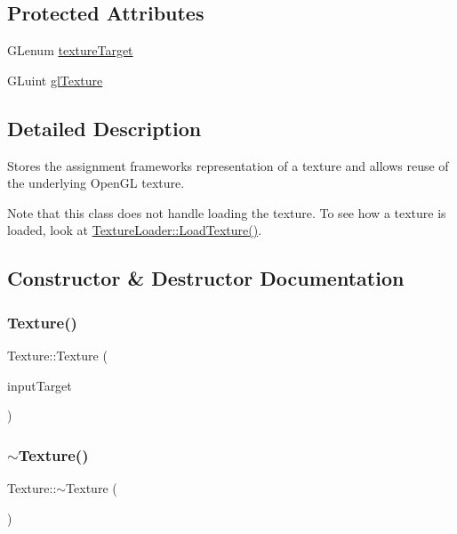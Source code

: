 \subsection*{Protected Attributes}
\begin{DoxyCompactItemize}
\item 
G\+Lenum \hyperlink{class_texture_a743402dc306a143404ee2d246d864fb7}{texture\+Target}
\item 
G\+Luint \hyperlink{class_texture_adbf320788255a426a0a60e35cd969bcd}{gl\+Texture}
\end{DoxyCompactItemize}


\subsection{Detailed Description}
Stores the assignment framework\textquotesingle{}s representation of a texture and allows reuse of the underlying Open\+GL texture. 

Note that this class does not handle loading the texture. To see how a texture is loaded, look at \hyperlink{namespace_texture_loader_aed2af32d44d07368f1f426c4274418c0}{Texture\+Loader\+::\+Load\+Texture()}. 

\subsection{Constructor \& Destructor Documentation}
\hypertarget{class_texture_aa9661e01f3c034c259c15b619e2cea55}{}\label{class_texture_aa9661e01f3c034c259c15b619e2cea55} 
\subsubsection{\texorpdfstring{Texture()}{Texture()}}
{\footnotesize\ttfamily Texture\+::\+Texture (\begin{DoxyParamCaption}\item[{G\+Lenum}]{input\+Target }\end{DoxyParamCaption})}

\hypertarget{class_texture_a09c4bcb7462f64c1d20fa69dba3cee8a}{}\label{class_texture_a09c4bcb7462f64c1d20fa69dba3cee8a} 
\subsubsection{\texorpdfstring{$\sim$\+Texture()}{~Texture()}}
{\footnotesize\ttfamily Texture\+::$\sim$\+Texture (\begin{DoxyParamCaption}{ }\end{DoxyParamCaption})\hspace{0.3cm}{\ttfamily [virtual]}}



